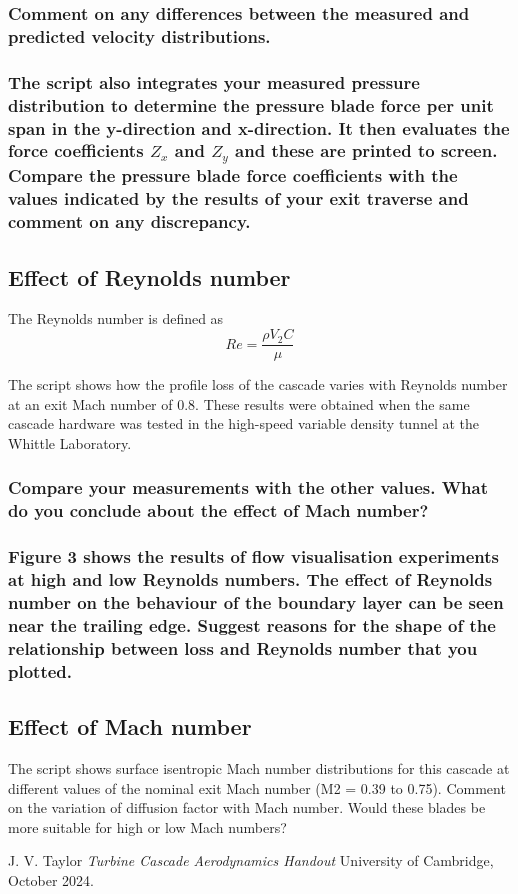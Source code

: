 \documentclass{article}
\begin{document}
\subsubsection{Comment on any differences between the measured and predicted velocity
distributions.}


\subsubsection{The script also integrates your measured pressure distribution to determine the pressure
blade force per unit span in the y-direction and x-direction. It then evaluates the force
coefficients $Z_x$ and $Z_y$ and these are printed to screen.
Compare the pressure blade force coefficients with the values indicated by the results of your
exit traverse and comment on any discrepancy.}


\subsection{Effect of Reynolds number}

The Reynolds number is defined as
\begin{equation}
    Re = \frac{\rho V_2 C}{\mu}
\end{equation}

The script shows how the profile loss of the cascade varies with Reynolds number at an exit
Mach number of 0.8. These results were obtained when the same cascade hardware was tested
in the high-speed variable density tunnel at the Whittle Laboratory.

\subsubsection{Compare your measurements with the other values. What do you conclude about the
effect of Mach number?}


\subsubsection{Figure 3 shows the results of flow visualisation experiments at high and low Reynolds
numbers. The effect of Reynolds number on the behaviour of the boundary layer can be seen
near the trailing edge. Suggest reasons for the shape of the relationship between loss and
Reynolds number that you plotted.}



\subsection{Effect of Mach number}
The script shows surface isentropic Mach number distributions for this cascade at different
values of the nominal exit Mach number (M2 = 0.39 to 0.75). Comment on the variation of
diffusion factor with Mach number. Would these blades be more suitable for high or low Mach
numbers?


\begin{thebibliography}{9}


  J. V. Taylor
  \emph{Turbine Cascade Aerodynamics Handout}
  University of Cambridge,
  October 2024.

\end{thebibliography}
\end{document}
